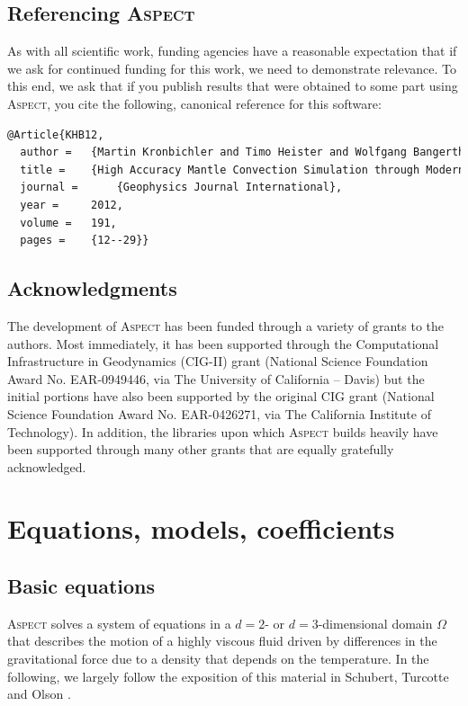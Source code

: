 \documentclass{article}
\newcommand{\aspect}{\textsc{Aspect}}
\begin{document}
\subsection{Referencing \aspect{}}

As with all scientific work, funding agencies have a reasonable expectation
that if we ask for continued funding for this work, we need to demonstrate
relevance. To this end, we ask that if you publish results that were obtained
to some part using \aspect{}, you cite the following, canonical reference for
this software:
\begin{lstlisting}[frame=single,language=tex]
@Article{KHB12,
  author = 	 {Martin Kronbichler and Timo Heister and Wolfgang Bangerth},
  title = 	 {High Accuracy Mantle Convection Simulation through Modern Numerical Methods},
  journal = 	 {Geophysics Journal International},
  year = 	 2012,
  volume = 	 191,
  pages = 	 {12--29}}
\end{lstlisting}


\subsection{Acknowledgments}

The development of \aspect{} has been funded
through a variety of grants to the authors. Most immediately, it has been
supported through the Computational Infrastructure in Geodynamics (CIG-II)
grant (National Science Foundation Award No. EAR-0949446, via The University
of California -- Davis) but the initial portions have also been supported
by the original CIG grant (National Science Foundation Award No. EAR-0426271,
via The California Institute of Technology). In addition, the libraries upon
which \aspect{} builds heavily have been supported through many other grants
that are equally gratefully acknowledged.


\section{Equations, models, coefficients}
\label{sec:models}

\subsection{Basic equations}
\label{sec:equations}

\aspect{} solves a system of equations in a $d=2$- or $d=3$-dimensional
domain $\Omega$ that describes the motion of a highly viscous fluid driven
by differences in the gravitational force due to a density that depends on
the temperature. In the following, we largely follow the exposition of this
material in Schubert, Turcotte and Olson \cite{STO01}.
\end{document}
